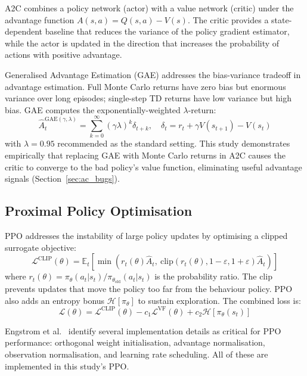 \documentclass[a4paper,12pt]{article}
\begin{document}
A2C \cite{mnih2016asynchronous} combines a policy network (actor) with a value network (critic) under the advantage function $A(s,a) = Q(s,a) - V(s)$. The critic provides a state-dependent baseline that reduces the variance of the policy gradient estimator, while the actor is updated in the direction that increases the probability of actions with positive advantage.

Generalised Advantage Estimation (GAE) \cite{schulman2015high} addresses the bias-variance tradeoff in advantage estimation. Full Monte Carlo returns have zero bias but enormous variance over long episodes; single-step TD returns have low variance but high bias. GAE computes the exponentially-weighted $\lambda$-return:
\begin{equation}
  \hat{A}_t^{\text{GAE}(\gamma,\lambda)} = \sum_{k=0}^{\infty} (\gamma\lambda)^k \delta_{t+k}, \quad \delta_t = r_t + \gamma V(s_{t+1}) - V(s_t)
\end{equation}
with $\lambda=0.95$ recommended as the standard setting. This study demonstrates empirically that replacing GAE with Monte Carlo returns in A2C causes the critic to converge to the bad policy's value function, eliminating useful advantage signals (Section~\ref{sec:ac_bugs}).

\subsection{Proximal Policy Optimisation}

PPO \cite{schulman2017proximal} addresses the instability of large policy updates by optimising a clipped surrogate objective:
\begin{equation}
  \mathcal{L}^{\text{CLIP}}(\theta) = \mathbb{E}_t\!\left[\min\!\left(r_t(\theta)\hat{A}_t,\ \text{clip}(r_t(\theta), 1-\varepsilon, 1+\varepsilon)\hat{A}_t\right)\right]
\end{equation}
where $r_t(\theta) = \pi_\theta(a_t|s_t)/\pi_{\theta_\text{old}}(a_t|s_t)$ is the probability ratio. The clip prevents updates that move the policy too far from the behaviour policy. PPO also adds an entropy bonus $\mathcal{H}[\pi_\theta]$ to sustain exploration. The combined loss is:
\begin{equation}
  \mathcal{L}(\theta) = \mathcal{L}^{\text{CLIP}}(\theta) - c_1 \mathcal{L}^{\text{VF}}(\theta) + c_2 \mathcal{H}[\pi_\theta(s_t)]
\end{equation}

Engstrom et al.\ \cite{engstrom2020implementation} identify several implementation details as critical for PPO performance: orthogonal weight initialisation, advantage normalisation, observation normalisation, and learning rate scheduling. All of these are implemented in this study's PPO.
\end{document}
